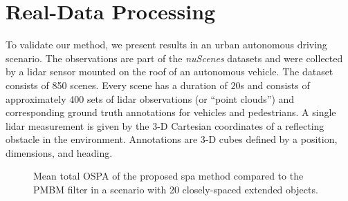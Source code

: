 \documentclass[10pt, twoside, romanappendices]{IEEEtran}
\begin{document}
\section{Real-Data Processing}

To validate our method, we present results in an urban autonomous driving scenario. The observations are part of the \textit{nuScenes} datasets \cite{nuScenes:W21} and were collected by a lidar sensor  mounted on the roof of an autonomous vehicle. The dataset consists of 850 scenes. Every scene has a duration of $20$s and consists of approximately 400 sets of lidar observations (or ``point clouds'') and corresponding ground truth annotations for vehicles and pedestrians. A single lidar measurement is given by the 3-D Cartesian coordinates of a reflecting obstacle in the environment.  Annotations are 3-D cubes defined by a position, dimensions, and heading. 

 \begin{figure}[t!]
\centering
{}
\caption{Mean total OSPA of the proposed \ac{spa} method compared to the PMBM filter in a scenario with 20 closely-spaced extended objects.}
\label{fig:errorsLarge}
\end{figure}
\end{document}
